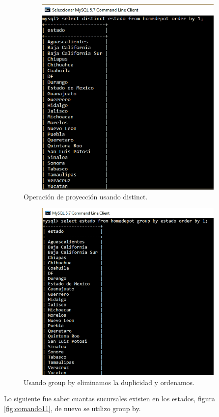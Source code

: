 \documentclass[12pt, titlepage]{article}
\begin{document}
 \begin{figure}[H]
	\begin{center}
		\includegraphics[width=12cm, height=10cm]{img/comando9.png}
		\caption{Operación de proyección usando distinct.}
		\label{fig:comando9}
	\end{center}
\end{figure}
 \begin{figure}[H]
	\begin{center}
		\includegraphics[width=12cm, height=9cm]{img/comando10.png}
		\caption{Usando group by eliminamos la duplicidad y ordenamos.}
		\label{fig:comando10}
	\end{center}
\end{figure}
Lo siguiente fue saber cuantas sucursales existen en los estados, figura \ref{fig:comando11}, de nuevo se utilizo group by.
\end{document}
